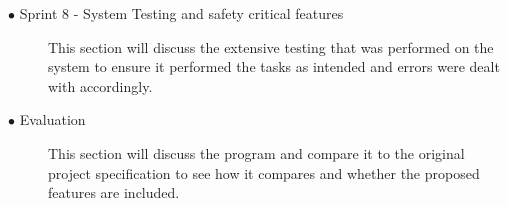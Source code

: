 \begin{description}
			\item[$\bullet$ Sprint 8 - System Testing and safety critical features]\hfill
						
			This section will discuss the extensive testing that was performed on the system to ensure it performed the tasks as intended and errors were dealt with accordingly.
			
			\item[$\bullet$ Evaluation]\hfill

			This section will discuss the program and compare it to the original project specification to see how it compares and whether the proposed features are included.

		\end{description}